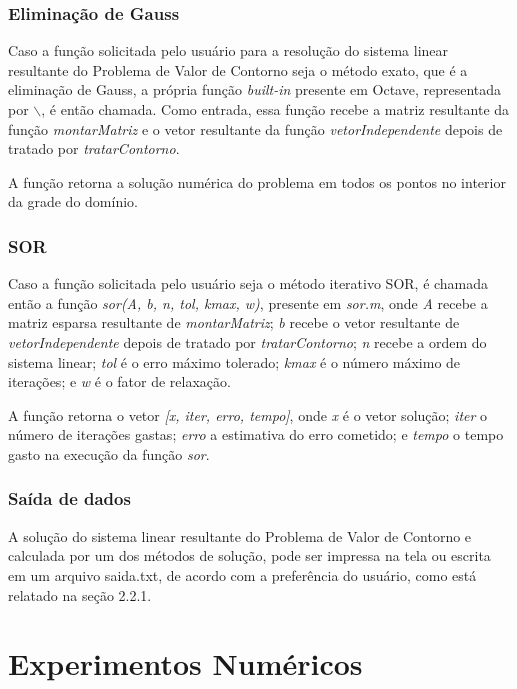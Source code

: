\documentclass[
	article,			%
	11pt,				%
	oneside,			%
	a4paper,			%
	english,			%
	brazil,				%
	sumario=tradicional
	]{abntex2}
\begin{document}
\subsubsection{Eliminação de Gauss}

Caso a função solicitada pelo usuário para a resolução do sistema linear resultante do Problema de Valor de Contorno seja o método exato, que é a eliminação de Gauss, a própria função \emph{built-in} presente em Octave, representada por $\backslash$, é então chamada.
Como entrada, essa função recebe a matriz resultante da função \emph{montarMatriz} e o vetor resultante da função \emph{vetorIndependente}
depois de tratado por \emph{tratarContorno}.

A função retorna a solução numérica do problema em todos os pontos no interior da grade do domínio.

\subsubsection{SOR}

Caso a função solicitada pelo usuário seja o método iterativo SOR, é chamada então a função \emph{sor(A, b, n, tol, kmax, w)},
presente em \emph{sor.m}, onde \emph{A} recebe a matriz esparsa resultante de \emph{montarMatriz}; \emph{b} recebe o vetor resultante de \emph{vetorIndependente}
depois de tratado por \emph{tratarContorno}; \emph{n} recebe a ordem do sistema linear; \emph{tol} é o erro máximo tolerado;
\emph{kmax} é o número máximo de iterações; e \emph{w} é o fator de relaxação.

A função retorna o vetor \emph{[x, iter, erro, tempo]}, onde \emph{x} é o vetor solução; \emph{iter} o número de iterações gastas;
\emph{erro} a estimativa do erro cometido; e \emph{tempo} o tempo gasto na execução da função \emph{sor}.

\subsubsection{Saída de dados}

A solução do sistema linear resultante do Problema de Valor de Contorno e calculada por um dos métodos de solução, pode ser
impressa na tela ou escrita em um arquivo saida.txt, de acordo com a preferência do usuário, como está relatado na seção 2.2.1.

\section{Experimentos Numéricos}
\end{document}
